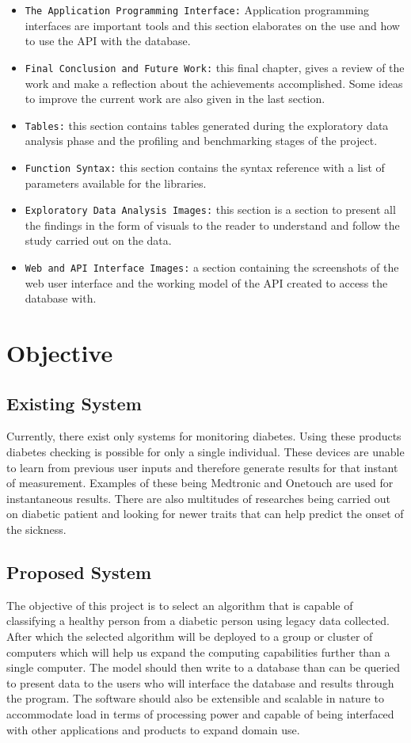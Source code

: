 \documentclass[12pt]{article}
\begin{document}
\begin{itemize}
\item \texttt{The Application Programming Interface:} Application programming interfaces are important tools and this section elaborates on the use and how to use the API with the database.
\item \texttt{Final Conclusion and Future Work:} this final chapter, gives a review of the work and make a reflection about the achievements accomplished. Some ideas to improve the current work are also given in the last section.
\item \texttt{Tables:} this section contains tables generated during the exploratory data analysis phase and the profiling and benchmarking stages of the project.
\item \texttt{Function Syntax:} this section contains the syntax reference with a list of parameters available for the libraries.
\item \texttt{Exploratory Data Analysis Images:} this section is a section to present all the findings in the form of visuals to the reader to understand and follow the study carried out on the data.
\item \texttt{Web and API Interface Images:} a section containing the screenshots of the web user interface and the working model of the API created to access the database with.
\end{itemize}


\clearpage
\newpage
\section{Objective}
\subsection{Existing System}
Currently, there exist only systems for monitoring diabetes. Using these products diabetes checking is possible for only a single individual. These devices are unable to learn from previous user inputs and therefore generate results for that instant of measurement. Examples of these being Medtronic\cite{medtronic} and Onetouch\cite{onetouch} are used for instantaneous results. There are also multitudes of researches being carried out on diabetic patient and looking for newer traits that can help predict the onset of the sickness.

\subsection{Proposed System}
The objective of this project is to select an algorithm that is capable of classifying a healthy person from a diabetic person using legacy data collected. After which the selected algorithm will be deployed to a group or cluster of computers which will help us expand the computing capabilities further than a single computer. The model should then write to a database than can be queried to present data to the users who will interface the database and results through the program. The software should also be extensible and scalable in nature to accommodate load in terms of processing power and capable of being interfaced with other applications and products to expand domain use.
\end{document}
